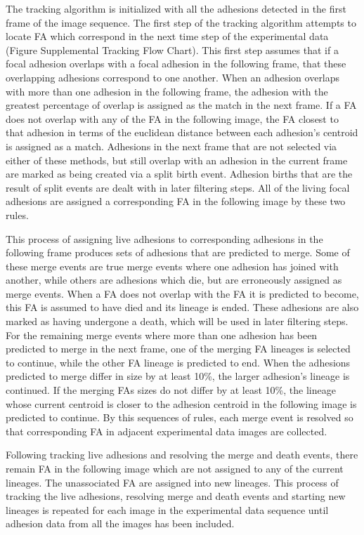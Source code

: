 \documentclass[10pt]{article}
\begin{document}
The tracking algorithm is initialized with all the adhesions detected in the
first frame of the image sequence. The first step of the tracking algorithm
attempts to locate FA which correspond in the next time step of the experimental
data (Figure Supplemental Tracking Flow Chart). This first step assumes that if
a focal adhesion overlaps with a focal adhesion in the following frame, that
these overlapping adhesions correspond to one another. When an adhesion overlaps
with more than one adhesion in the following frame, the adhesion with the
greatest percentage of overlap is assigned as the match in the next frame. If a
FA does not overlap with any of the FA in the following image, the FA closest to
that adhesion in terms of the euclidean distance between each adhesion's
centroid is assigned as a match. Adhesions in the next frame that are not
selected via either of these methods, but still overlap with an adhesion in the
current frame are marked as being created via a split birth event. Adhesion
births that are the result of split events are dealt with in later filtering
steps. All of the living focal adhesions are assigned a corresponding FA in the
following image by these two rules.

This process of assigning live adhesions to corresponding adhesions in the
following frame produces sets of adhesions that are predicted to merge. Some of
these merge events are true merge events where one adhesion has joined with
another, while others are adhesions which die, but are erroneously assigned as
merge events. When a FA does not overlap with the FA it is predicted to become,
this FA is assumed to have died and its lineage is ended. These adhesions are
also marked as having undergone a death, which will be used in later filtering
steps. For the remaining merge events where more than one adhesion has been
predicted to merge in the next frame, one of the merging FA lineages is selected
to continue, while the other FA lineage is predicted to end. When the adhesions
predicted to merge differ in size by at least 10\%, the larger adhesion's
lineage is continued. If the merging FAs sizes do not differ by at least 10\%,
the lineage whose current centroid is closer to the adhesion centroid in the
following image is predicted to continue. By this sequences of rules, each merge
event is resolved so that corresponding FA in adjacent experimental data images
are collected.

Following tracking live adhesions and resolving the merge and death events,
there remain FA in the following image which are not assigned to any of the
current lineages. The unassociated FA are assigned into new lineages. This
process of tracking the live adhesions, resolving merge and death events and
starting new lineages is repeated for each image in the experimental data
sequence until adhesion data from all the images has been included.
\end{document}
